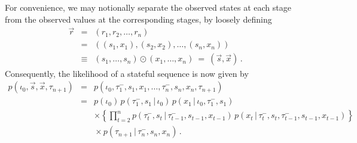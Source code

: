 \documentclass[a4paper]{article}
\newcommand{\vr}{\vec{r}}
\newcommand{\tm}{\tau^{-}}
\newcommand{\vs}{\vec{s}}
\newcommand{\vx}{\vec{x}}
\begin{document}
For convenience, we may notionally separate the observed states at each stage from the observed values at the corresponding stages, by loosely defining
\begin{eqnarray}
\vr & = & (r_1,r_2,\ldots,r_n)
\nonumber\\& = & 
((s_1,x_1),(s_2,x_2),\ldots,(s_n,x_n))
\nonumber\\& \equiv & 
(s_1,\ldots,s_n)\odot (x_1,\ldots,x_n)~=~(\vs,\vx)\,.
\end{eqnarray}
Consequently, the likelihood of a stateful sequence is now given by
\begin{eqnarray}
p(\iota_0,\vs,\vx,\tau_{n+1}) & = &
p(\iota_0,\tm_1,s_1,x_1,\ldots,\tm_n,s_n,x_n,\tau_{n+1})
\nonumber\\& = &
p(\iota_0)\,p(\tm_1,s_1\,|\,\iota_0)\,p(x_1\,|\,\iota_0,\tm_1,s_1)
\nonumber\\{}&&\times
\left\{\prod_{t=2}^{n}p(\tm_t,s_t\,|\,\tm_{t-1},s_{t-1},x_{t-1})\,p(x_t\,|\,\tm_t,s_t,\tm_{t-1},s_{t-1},x_{t-1})\right\}
\nonumber\\&&{}\times
p(\tau_{n+1}\,|\,\tm_n,s_n,x_n)
%
\,.
\end{eqnarray}
\end{document}
